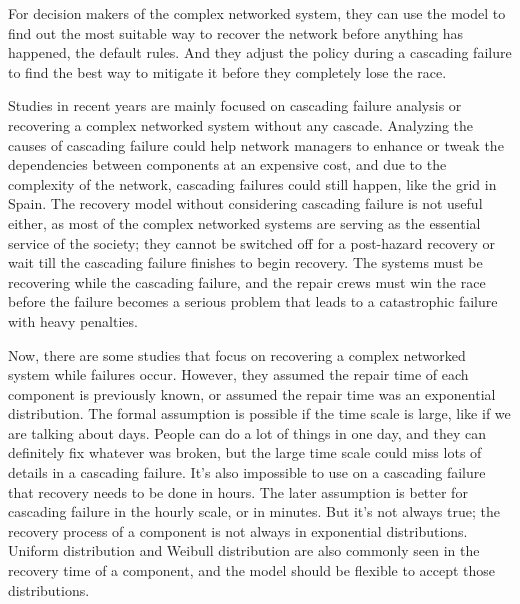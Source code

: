 For decision makers of the complex networked system, they can use the model to find out the most suitable way to recover the network before anything has happened, the default rules. And they adjust the policy during a cascading failure to find the best way to mitigate it before they completely lose the race.



Studies in recent years are mainly focused on cascading failure analysis or recovering a complex networked system without any cascade. 
Analyzing the causes of cascading failure could help network managers to enhance or tweak the dependencies between components at an expensive cost, and due to the complexity of the network, cascading failures could still happen, like the grid in Spain. 
The recovery model without considering cascading failure is not useful either, as most of the complex networked systems are serving as the essential service of the society; they cannot be switched off for a post-hazard recovery or wait till the cascading failure finishes to begin recovery. The systems must be recovering while the cascading failure, and the repair crews must win the race before the failure becomes a serious problem that leads to a catastrophic failure with heavy penalties. 

Now, there are some studies that focus on recovering a complex networked system while failures occur. However, they assumed the repair time of each component is previously known, or assumed the repair time was an exponential distribution. The formal assumption is possible if the time scale is large, like if we are talking about days. People can do a lot of things in one day, and they can definitely fix whatever was broken, but the large time scale could miss lots of details in a cascading failure. It's also impossible to use on a cascading failure that recovery needs to be done in hours. The later assumption is better for cascading failure in the hourly scale, or in minutes. But it's not always true; the recovery process of a component is not always in exponential distributions. Uniform distribution and Weibull distribution are also commonly seen in the recovery time of a component, and the model should be flexible to accept those distributions. %

